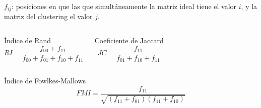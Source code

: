 \begin{frame}

    $f_{ij}$: posiciones en que las que simultáneamente la matriz ideal tiene el valor $i$, y la matriz del clustering el valor $j$.

    \begin{columns}

        \pause

        \begin{block}{Índice de Rand}
            \begin{equation*}
                RI = \frac{f_{00} + f_{11}}{f_{00}+f_{01}+f_{10}+f_{11}}
            \end{equation*}
        \end{block}

        \pause

        \begin{block}{Coeficiente de Jaccard}
            \begin{equation*}
                JC = \frac{f_{11}}{f_{01}+f_{10}+f_{11}}
            \end{equation*}
        \end{block}

    \end{columns}

    \pause
    \begin{block}{Índice de Fowlkes-Mallows}
        \begin{equation*}
            FMI = \frac{f_{11}}{\sqrt{(f_{11}+f_{01})(f_{11}+f_{10})}}
        \end{equation*}
    \end{block}

\end{frame}

